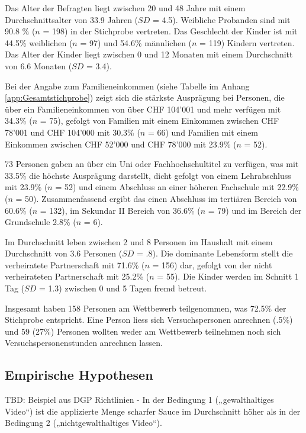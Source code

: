 Das Alter der Befragten liegt zwischen 20 und 48 Jahre mit einem Durchschnittsalter von 33.9 Jahren ($SD$ = 4.5). Weibliche Probanden sind mit 90.8 \% ($n$ = 198) in der Stichprobe vertreten. Das Geschlecht der Kinder ist mit 44.5\% weiblichen ($n$ = 97) und 54.6\% männlichen ($n$ = 119) Kindern vertreten. Das Alter der Kinder liegt zwischen 0 und 12 Monaten mit einem Durchschnitt von 6.6 Monaten ($SD$ = 3.4).

Bei der Angabe zum Familieneinkommen (siehe Tabelle  im Anhang \ref{app:Gesamtstichprobe}) zeigt sich die stärkste Ausprägung bei Personen, die über ein Familieneinkommen von über CHF 104'001 und mehr verfügen mit 34.3\% ($n$ = 75), gefolgt von Familien mit einem Einkommen zwischen CHF 78'001 und CHF 104'000 mit 30.3\% ($n$ = 66) und Familien mit einem Einkommen zwischen CHF 52'000 und CHF 78'000 mit 23.9\% ($n$ = 52). 

73 Personen gaben an über ein Uni oder Fachhochschultitel zu verfügen, was mit 33.5\% die höchste Ausprägung darstellt, dicht gefolgt von einem Lehrabschluss mit 23.9\% ($n$ = 52) und einem Abschluss an einer höheren Fachschule mit 22.9\% ($n$ = 50). Zusammenfassend ergibt das einen Abschluss im tertiären Bereich von 60.6\% ($n$ = 132), im Sekundar II Bereich von 36.6\% ($n$ = 79) und im Bereich der Grundschule 2.8\% ($n$ = 6).

Im Durchschnitt leben zwischen 2 und 8 Personen im Haushalt mit einem Durchschnitt von 3.6 Personen ($SD$ = .8). Die dominante Lebensform stellt die verheiratete Partnerschaft mit 71.6\% ($n$ = 156) dar, gefolgt von der nicht verheirateten Partnerschaft mit 25.2\% ($n$ = 55). Die Kinder werden im Schnitt 1 Tag ($SD$ = 1.3)  zwischen 0 und 5 Tagen fremd betreut.

Insgesamt haben 158 Personen am Wettbewerb teilgenommen, was 72.5\% der Stichprobe entspricht. Eine Person liess sich Versuchspersonen anrechnen (.5\%) und 59 (27\%) Personen wollten weder am Wettbewerb teilnehmen noch sich Versuchspersonenstunden anrechnen lassen.

\subsection{Empirische Hypothesen}\label{sec:EmpirischeHypothesen}
TBD: Beispiel aus DGP Richtlinien - In der Bedingung 1 („gewalthaltiges Video“) ist die applizierte Menge scharfer Sauce im Durchschnitt höher als in der Bedingung 2 („nichtgewalthaltiges Video“).

